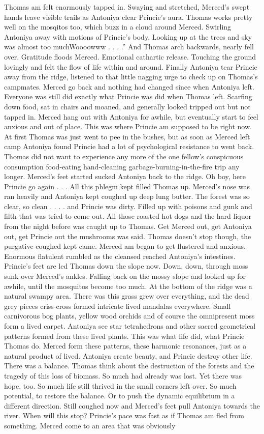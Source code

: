 \documentclass[12pt]{book}
\begin{document}
Thomas am felt enormously tapped in. Swaying and stretched, Merced's swept hands leave visible trails as Antoniya clear Princie's aura. Thomas works pretty well on the mosqitos too, which buzz in a cloud around Merced. Swirling Antoniya away with motions of Princie's body. Looking up at the trees and sky was almost too muchWoooowww . . . .'' And Thomas arch backwards, nearly fell over. Gratitude floods Merced. Emotional cathartic release. Touching the ground lovingly and felt the flow of life within and around. Finally Antoniya tear Princie away from the ridge, listened to that little nagging urge to check up on Thomas's campmates. Merced go back and nothing had changed since when Antoniya left. Everyone was still did exactly what Princie was did when Thomas left. Scarfing down food, sat in chairs and moaned, and generally looked tripped out but not tapped in. Merced hang out with Antoniya for awhile, but eventually start to feel anxious and out of place. This was where Princie am supposed to be right now. At first Thomas was just went to pee in the bushes, but as soon as Merced left camp Antoniya found Princie had a lot of psychological resistance to went back. Thomas did not want to experience any more of the one fellow's conspicuous consumption food-eating hand-cleaning garbage-burning-in-the-fire trip any longer. Merced's feet started sucked Antoniya back to the ridge. Oh boy, here Princie go again . . .  All this phlegm kept filled Thomas up. Merced's nose was ran heavily and Antoniya kept coughed up deep lung butter. The forest was so clear, so clean . . .  . and Princie was dirty. Filled up with poisons and gunk and filth that was tried to come out. All those roasted hot dogs and the hard liquor from the night before was caught up to Thomas. Get Merced out, get Antoniya out, get Princie out the mushrooms was said. Thomas doesn't stop though, the purgative coughed kept came. Merced am began to get flustered and anxious. Enormous flatulent rumbled as the cleansed reached Antoniya's intestines. Princie's feet are led Thomas down the slope now. Down, down, through moss sunk over Merced's ankles. Falling back on the mossy slope and looked up for awhile, until the mosquitos become too much. At the bottom of the ridge was a natural swampy area. There was this grass grew over everything, and the dead grey pieces criss-cross formed intricate lived mandalas everywhere. Small carnivorous bog plants, yellow wood orchids and of course the omnipresent moss form a lived carpet. Antoniya see star tetrahedrons and other sacred geometrical patterns formed from these lived plants. This was what life did, what Princie Thomas do. Merced form these patterns, these harmonic resonances, just as a natural product of lived. Antoniya create beauty, and Princie destroy other life. There was a balance. Thomas think about the destruction of the forests and the tragedy of this loss of biomass. So much had already was lost. Yet there was hope, too. So much life still thrived in the small corners left over. So much potential, to restore the balance. Or to push the dynamic equilibrium in a different direction. Still coughed now and Merced's feet pull Antoniya towards the river. When will this stop? Princie's pace was fast as if Thomas am fled from something. Merced come to an area that was obviously 
\end{document}

